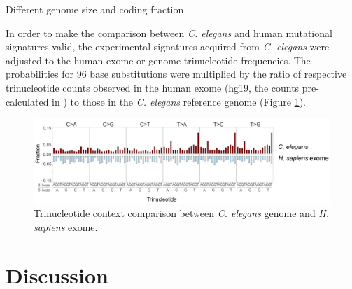 Different genome size and coding fraction

In order to make the comparison between \textit{C. elegans} and human mutational signatures valid,
the experimental signatures acquired from \textit{C. elegans} were adjusted to the human exome or genome trinucleotide
frequencies. The probabilities for 96 base substitutions were multiplied by the ratio of respective 
trinucleotide counts observed in the human exome (hg19, the counts pre-calculated in \cite{Rosenthal})
to those in the \textit{C. elegans} reference genome (Figure \ref{Trinucleotide}).

\begin{figure}[h]
  \centering
  \centerline{\includegraphics[width=1\textwidth]{figures/Trinucleotide.png}}
  \caption{Trinucleotide context comparison between \textit{C. elegans} genome and \textit{H. sapiens} exome.}
  \label{Trinucleotide}
\end{figure}

\section{Discussion}


